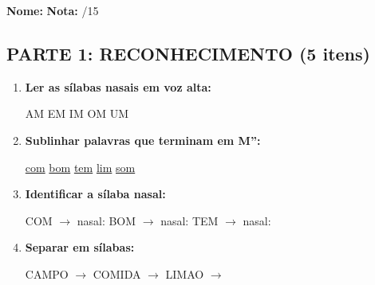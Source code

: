 \begin{exercicio}

\noindent\textbf{Nome:} \underline{\hspace{4cm}} \quad \textbf{Nota:} \underline{\hspace{1cm}}/15

\subsection*{PARTE 1: RECONHECIMENTO (5 itens)}

\begin{enumerate}
  \item \textbf{Ler as sílabas nasais em voz alta:}
  \begin{center}
  AM \quad EM \quad IM \quad OM \quad UM
  \end{center}

  \item \textbf{Sublinhar palavras que terminam em M'':}
  \begin{center}
  \uline{com} \quad \uline{bom} \quad \uline{tem} \quad \uline{lim} \quad \uline{som}
  \end{center}

  \item \textbf{Identificar a sílaba nasal:}
  \begin{center}
  COM $\rightarrow$ nasal: \underline{\hspace{1cm}} \quad BOM $\rightarrow$ nasal: \underline{\hspace{1cm}} \quad TEM $\rightarrow$ nasal: \underline{\hspace{1cm}}
  \end{center}

  \item \textbf{Separar em sílabas:}
  \begin{center}
  CAMPO $\rightarrow$ \underline{\hspace{1.5cm}} \underline{\hspace{1.5cm}} \quad COMIDA $\rightarrow$ \underline{\hspace{1.5cm}} \underline{\hspace{1.5cm}} \underline{\hspace{1.5cm}} \quad LIMAO $\rightarrow$ \underline{\hspace{1.5cm}} \underline{\hspace{1.5cm}}
  \end{center}


\end{enumerate}
\end{exercicio}
